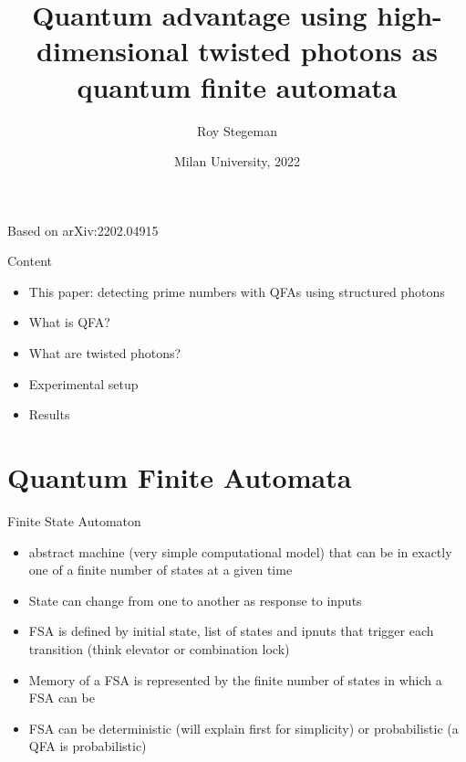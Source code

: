 \documentclass[aspectratio=169,9pt]{beamer}
\title{Quantum advantage using high-dimensional twisted photons as quantum finite automata}
\date{Milan University, 2022}
\author{Roy Stegeman}
\institute{University of Milan and INFN Milan}
\begin{document}
{
\begin{frame}
  \titlepage


  Based on arXiv:2202.04915

\end{frame}
}



\begin{frame}[t]{Content}
  \begin{itemize}
    \item This paper: detecting prime numbers with QFAs using structured photons
    \item What is QFA?
    \item What are twisted photons?
    \item Experimental setup
    \item Results
  \end{itemize}
\end{frame}


\section{Quantum Finite Automata}
\begin{frame}[t]{Finite State Automaton}
  \begin{itemize}
    \item abstract machine (very simple computational model) that can be in exactly one of a finite number of states at a given time
    \item State can change from one to another as response to inputs
    \item FSA is defined by initial state, list of states and ipnuts that trigger each transition (think elevator or combination lock)
    \item Memory of a FSA is represented by the finite number of states in which a FSA can be
    \item FSA can be deterministic (will explain first for simplicity) or probabilistic (a QFA is probabilistic)
  \end{itemize}
\end{frame}
\end{document}
